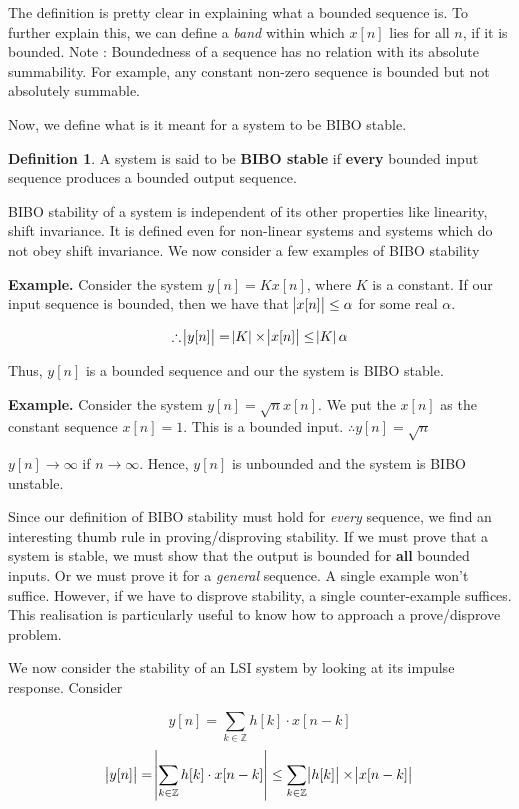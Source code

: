 \documentclass{article}
\theoremstyle{definition}
\newtheorem{defn}[theorem]{Definition}
\begin{document}
The definition is pretty clear in explaining what a bounded sequence is. To further explain this, we can define a \textit{band} within which $x[n]$ lies for all $n$, if it is bounded. Note : Boundedness of a sequence has no relation with its absolute summability. For example, any constant non-zero sequence is bounded but not absolutely summable. \smallskip

Now, we define what is it meant for a system to be BIBO stable. 

\begin{defn}
	A system is said to be \textbf{BIBO stable} if \textbf{every} bounded input sequence produces a bounded output sequence.
\end{defn}

BIBO stability of a system is independent of its other properties like linearity, shift invariance. It is defined even for non-linear systems and systems which do not obey shift invariance. We now consider a few examples of BIBO stability 

\textbf{Example.} Consider the system $y[n] = K x[n]$, where $K$ is a constant. If our input sequence is bounded, then we have that $\abs{x[n]} \leq \alpha$ for some real $\alpha$. 

\[
	\therefore \abs{y[n]} = \abs{K} \times \abs{x[n]} \leq \abs{K} \alpha 
\]	

Thus, $y[n]$ is a bounded sequence and our the system is BIBO stable.

\textbf{Example.} Consider the system $y[n] = \sqrt{n} x[n]$. We put the $x[n]$ as the constant sequence $x[n] = 1$. This is a bounded input. $\therefore y[n] = \sqrt{n} $

$y[n] \rightarrow \infty$ if $n \rightarrow \infty$. Hence, $y[n]$ is unbounded and the system is BIBO unstable.

Since our definition of BIBO stability must hold for \textit{every} sequence, we find an interesting thumb rule in proving/disproving stability. If we must prove that a system is stable, we must show that the output is bounded for \textbf{all} bounded inputs. Or we must prove it for a \textit{general} sequence. A single example won't suffice. However, if we have to disprove stability, a single counter-example suffices. This realisation is particularly useful to know how to approach a prove/disprove problem. \smallskip

We now consider the stability of an LSI system by looking at its impulse response. Consider 

\[
	y[n] = \sum_{k \in \mathbb{Z}} h[k] \cdot x[n-k]
\]	
\[
	\abs{y[n]} = \abs{\sum_{k \in \mathbb{Z}} h[k]\cdot  x[n-k]} \leq \sum_{k \in \mathbb{Z}} \abs{h[k]} \times \abs{x[n-k]}
\]
\end{document}
